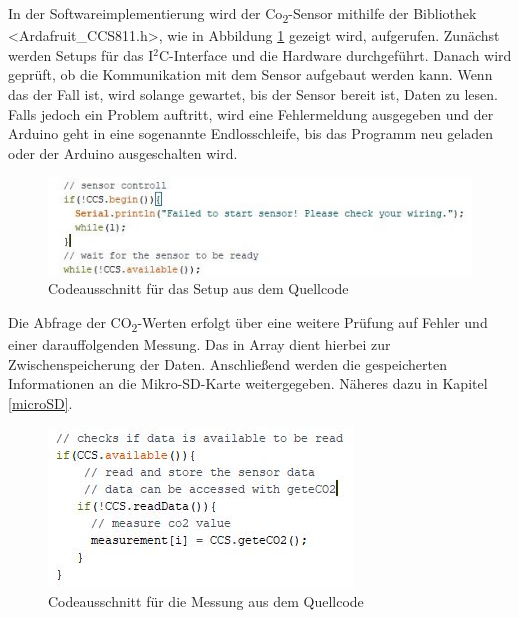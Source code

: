 In der Softwareimplementierung wird der Co\textsubscript{2}-Sensor mithilfe der Bibliothek <Ardafruit\_CCS811.h>, wie in Abbildung \ref{fig:Setup} gezeigt wird, aufgerufen. Zunächst werden Setups für das I$^2$C-Interface und die Hardware durchgeführt. Danach wird geprüft, ob die Kommunikation mit dem Sensor aufgebaut werden kann. Wenn das der Fall ist, wird solange gewartet, bis der Sensor bereit ist, Daten zu lesen. Falls jedoch ein Problem auftritt, wird eine Fehlermeldung ausgegeben und der Arduino geht in eine sogenannte Endlosschleife, bis das Programm neu geladen oder der Arduino ausgeschalten wird.

\begin{figure}[!hbt]
	\centering
	\includegraphics[width=0.9\linewidth]{Images/ccs811Setup}
	\caption{Codeausschnitt für das Setup aus dem Quellcode}
	\label{fig:Setup}
\end{figure}

Die Abfrage der CO\textsubscript{2}-Werten erfolgt über eine weitere Prüfung auf Fehler und einer darauffolgenden Messung. Das in Array dient hierbei zur Zwischenspeicherung der Daten. Anschließend werden die gespeicherten Informationen an die Mikro-SD-Karte weitergegeben. Näheres dazu in Kapitel \ref{microSD}.

\begin{figure}[!hbt]
	\centering
	\includegraphics[width=0.5\linewidth]{Images/ccs811Loop}
	\caption{Codeausschnitt für die Messung aus dem Quellcode}
	\label{fig:Loop}
\end{figure}

